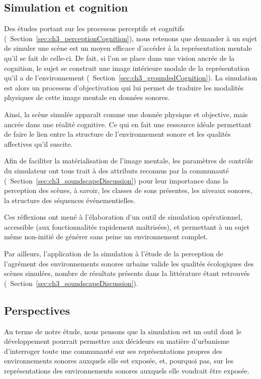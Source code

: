 \subsection{Simulation et cognition}

Des études portant sur les processus perceptifs et cognitifs (\cf~Section~\ref{sec:ch3_perceptionCognition}), nous retenons que demander à un sujet de simuler une scène est un moyen efficace d'accéder à la représentation mentale qu'il se fait de celle-ci. De fait, si l'on se place dans une vision ancrée de la cognition, le sujet se construit une image intérieure modale de la représentation qu'il a de l'environnement (\cf~Section~\ref{sec:ch3_groundedCognition}). La simulation est alors un processus d'objectivation qui lui permet de traduire les modalités physiques de cette image mentale en données sonores.

Ainsi, la scène simulée apparaît comme une donnée physique et objective, mais ancrée dans une réalité cognitive. Ce qui en fait une ressource idéale permettant de faire le lien entre la structure de l'environnement sonore et les qualités affectives qu'il suscite.

Afin de faciliter la matérialisation de l'image mentale, les paramètres de contrôle du simulateur ont tous trait à des attributs reconnus par la communauté (\cf~Section~\ref{sec:ch3_soundscapeDiscussion}) pour leur importance dans la perception des scènes, à savoir, les classes de sons présentes, les niveaux sonores, la structure des séquences événementielles.

Ces réflexions ont mené à l'élaboration d'un outil de simulation opérationnel, accessible (aux fonctionnalités rapidement maîtrisées), et permettant à un sujet même non-initié de générer sans peine un environnement complet.

Par ailleurs, l'application de la simulation à l’étude de la perception de l'agrément des environnements sonores urbains valide les qualités écologiques des scènes simulées, nombre de résultats présents dans la littérature étant retrouvés (\cf~Section~\ref{sec:ch3_soundscapeDiscussion}).

\subsection{Perspectives}

Au terme de notre étude, nous pensons que la simulation est un outil dont le développement pourrait permettre aux décideurs en matière d'urbanisme d'interroger toute une communauté sur ses représentations propres des environnements sonores auxquels elle est exposée, et, pourquoi pas, sur les représentations des environnements sonores auxquels elle voudrait être exposée.

